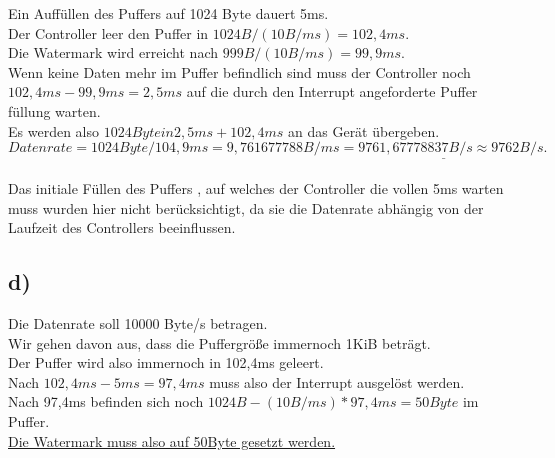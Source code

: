 \documentclass{ti2}
\begin{document}
Ein Auffüllen des Puffers auf 1024 Byte dauert 5ms.\\
Der Controller leer den Puffer in $1024B / (10B/ms) = 102,4ms$.\\
Die Watermark wird erreicht nach $999B / (10B/ms) = 99,9ms$.\\
Wenn keine Daten mehr im Puffer befindlich sind muss der Controller noch $102,4ms-99,9ms = 2,5ms$ auf die durch den Interrupt angeforderte Puffer füllung warten.\\
Es werden also $1024Byte in 2,5ms+102,4ms$ an das Gerät übergeben.\\
\begin{math}
Datenrate = {1024 Byte}/{104,9ms} = 9,761677788 B/ms \underline{= 9761,67778837 B/s \approx 9762 B/s.}
\end{math}\\\\
Das initiale Füllen des Puffers , auf welches der Controller die vollen 5ms warten muss wurden hier nicht berücksichtigt, da sie die Datenrate abhängig von der Laufzeit des Controllers beeinflussen.\\


\subsection*{d)}

Die Datenrate soll 10000 Byte/s betragen.\\
Wir gehen davon aus, dass die Puffergröße immernoch 1KiB beträgt.\\
Der Puffer wird also immernoch in 102,4ms geleert.\\
Nach $102,4ms - 5ms = 97,4ms$ muss also der Interrupt ausgelöst werden.\\
Nach 97,4ms befinden sich noch $1024B - (10B/ms)*97,4ms = 50Byte$ im Puffer.\\
\underline{Die Watermark muss also auf 50Byte gesetzt werden.}\\
\end{document}
